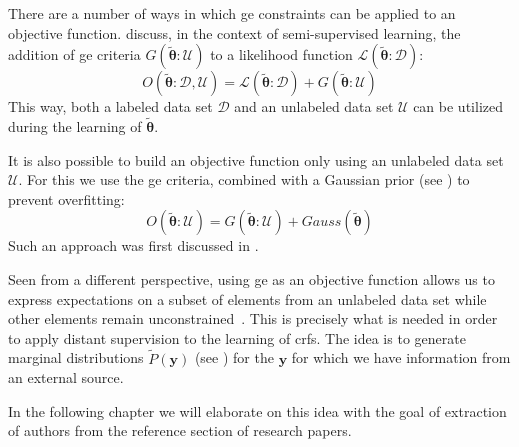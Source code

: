 \bigskip

There are a number of ways in which \gls{ge} constraints can be applied to an \gls{objective function}.
\citet{mann2010generalized} discuss, in the context of semi-supervised learning, the addition of \gls{ge} criteria $G(\bm{\tilde{\theta}}:\mathcal{U})$ to a likelihood function $\mathcal{L}(\bm{\tilde{\theta}}:\mathcal{D})$:
\begin{equation}
  \label{equ:objective-function-l-g}
  O(\bm{\tilde{\theta}}:\mathcal{D},\mathcal{U})=\mathcal{L}(\bm{\tilde{\theta}}:\mathcal{D})+G(\bm{\tilde{\theta}}:\mathcal{U})
\end{equation}
This way, both a labeled data set $\mathcal{D}$ and an unlabeled data set $\mathcal{U}$ can be utilized during the learning of $\bm{\tilde{\theta}}$.

It is also possible to build an \gls{objective function} only using an unlabeled data set $\mathcal{U}$.
For this we use the \gls{ge} criteria, combined with a Gaussian prior (see ) to prevent overfitting:
\begin{equation}
  \label{equ:objective-function-g}
  O(\bm{\tilde{\theta}}:\mathcal{U})=G(\bm{\tilde{\theta}}:\mathcal{U})+Gauss(\bm{\tilde{\theta}})
\end{equation}
Such an approach was first discussed in \citet{mann2008generalized}.

Seen from a different perspective, using \gls{ge} as an objective function allows us to express expectations on a subset of elements from an unlabeled data set while other elements remain unconstrained~\citep{mann2010generalized}.
This is precisely what is needed in order to apply \gls{distant supervision} to the learning of \glspl{crf}.
The idea is to generate \glspl{marginal distribution} $\tilde{P}(\mathbf{y})$ (see ) for the $\mathbf{y}$ for which we have information from an external source.

In the following chapter we will elaborate on this idea with the goal of extraction of authors from the reference section of research papers.

